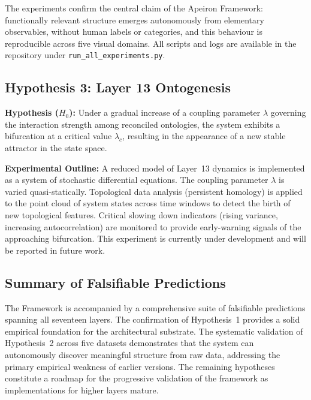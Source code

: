 The experiments confirm the central claim of the Apeiron Framework:
functionally relevant structure emerges autonomously from elementary
observables, without human labels or categories, and this behaviour is
reproducible across five visual domains.  All scripts and logs are
available in the repository under
\texttt{run\_all\_experiments.py}.

\subsection{Hypothesis 3: Layer 13 Ontogenesis}
\label{subsec:validation-h3}

\textbf{Hypothesis ($H_0$):} Under a gradual increase of a coupling parameter $\lambda$ governing the interaction strength among reconciled ontologies, the system exhibits a bifurcation at a critical value $\lambda_c$, resulting in the appearance of a new stable attractor in the state space.

\textbf{Experimental Outline:} A reduced model of Layer~13 dynamics is implemented as a system of stochastic differential equations. The coupling parameter $\lambda$ is varied quasi-statically. Topological data analysis (persistent homology) is applied to the point cloud of system states across time windows to detect the birth of new topological features. Critical slowing down indicators (rising variance, increasing autocorrelation) are monitored to provide early-warning signals of the approaching bifurcation. This experiment is currently under development and will be reported in future work.

\subsection{Summary of Falsifiable Predictions}
\label{subsec:validation_summary}

The \Apeiron{} Framework is accompanied by a comprehensive suite of
falsifiable predictions spanning all seventeen layers.  The
confirmation of Hypothesis~1 provides a solid empirical foundation for
the architectural substrate.  The systematic validation of
Hypothesis~2 across five datasets demonstrates that the system can
autonomously discover meaningful structure from raw data, addressing
the primary empirical weakness of earlier versions.  The remaining
hypotheses constitute a roadmap for the progressive validation of the
framework as implementations for higher layers mature.